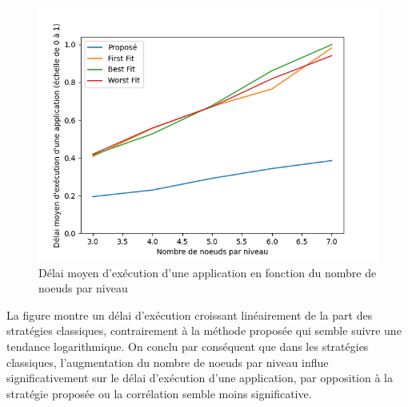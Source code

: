 \begin{figure}[H]
    \centering
    \includegraphics[]{src/ressources/loopDelayPerLvl.png}
    \caption{Délai moyen d'exécution d’une application en fonction du nombre de noeuds par niveau}
    \label{fig:}
\end{figure}

La figure montre un délai d'exécution croissant linéairement de la part des stratégies classiques, contrairement à la méthode proposée qui semble suivre une tendance logarithmique. On conclu par conséquent que dans les stratégies classiques, l'augmentation du nombre de noeuds par niveau influe significativement sur le délai d'exécution d'une application, par opposition à la stratégie proposée ou la corrélation semble moins significative.   


